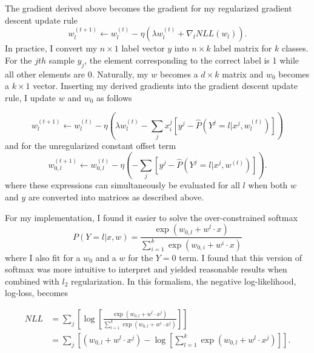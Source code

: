 \documentclass[12pt]{amsart}
\begin{document}
The gradient derived above becomes the gradient for my regularized gradient descent update rule
\begin{equation}
 w_l^{(t+1)} \leftarrow w_l^{(t)} - \eta (\lambda w_l^{(t)} + \nabla_l NLL(w_l)).
 \end{equation}
 In practice, I convert my $n \times 1$ label vector $y$ into $n \times k$ label matrix for $k$ classes.  For the $jth$ sample $y_j$, the element corresponding to the correct label is 1 while all other elements are 0.  Naturally, my $w$ becomes a $d \times k$ matrix and $w_0$ becomes a $k \times 1$ vector.  Inserting my derived gradients into the gradient descent update rule, I update $w$ and $w_0$ as follows
 
 \begin{equation}
w^{(t+1)}_l \leftarrow w^{(t)}_l - \eta (\lambda w^{(t)}_l - \sum_j x^j_i[y^j - \hat{P}(Y^j = l | x^j, w_l^{(t)})])
\end{equation}
and for the unregularized constant offset term
\begin{equation}
w^{(t+1)}_{0,l} \leftarrow w^{(t)}_{0,l} - \eta (- \sum_j[y^j - \hat{P}(Y^j = l | x^j, w^{(t)})]).
\end{equation}
where these expressions can simultaneously be evaluated for all $l$ when both $w$ and $y$ are converted into matrices as described above.

For my implementation, I found it easier to solve the over-constrained softmax
\begin{equation}
P(Y = l | x, w) = \frac{\exp{(w_{0,l} + w^l \cdot x)}}{\sum_{i = 1}^{k}\exp{(w_{0,i} + w^i \cdot x)}}
\end{equation}
where I also fit for a $w_0$ and a $w$ for the $Y = 0$ term.  I found that this version of softmax was more intuitive to interpret and yielded reasonable results when combined with $l_2$ regularization.  In this formalism, the negative log-likelihood, log-loss, becomes

\begin{equation} \label{eqn:softmax_logloss_exp_actual}
\begin{split}
NLL & = \sum_j \left[ \log \left[  \frac{\exp{(w_{0,l} + w^l \cdot x^j)}}{\sum_{l = 1}^{k}\exp{(w_{0,l} + w^i \cdot x^j)}} \right]\right] \\
& = \sum_j \left[(w_{0,l} + w^l \cdot x^j) - \log[\sum_{l = 1}^{k}\exp{(w_{0,l} + w^l \cdot x^j)}] \right].
\end{split}
\end{equation}
\end{document}
